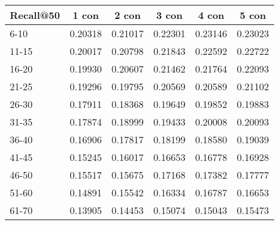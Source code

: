 \begin{table*}[]
    \begin{tabular}{|l|l|l|l|l|l|}
    \hline
    Recall@50 & \multicolumn{1}{c|}{1 con} & \multicolumn{1}{c|}{2 con} & \multicolumn{1}{c|}{3 con} & \multicolumn{1}{c|}{4 con} & \multicolumn{1}{c|}{5 con} \\ \hline
    6-10      & 0.20318                    & 0.21017                    & 0.22301                    & 0.23146                    & 0.23023                           \\ \hline
    11-15     & 0.20017                    & 0.20798                    & 0.21843                    & 0.22592                    & 0.22722                    \\ \hline
    16-20     & 0.19930                    & 0.20607                    & 0.21462                    & 0.21764                    & 0.22093                    \\ \hline
    21-25     & 0.19296                    & 0.19795                    & 0.20569                    & 0.20589                    & 0.21102                    \\ \hline
    26-30     & 0.17911                    & 0.18368                    & 0.19649                    & 0.19852                    & 0.19883                    \\ \hline
    31-35     & 0.17874                    & 0.18999                    & 0.19433                    & 0.20008                    & 0.20093                    \\ \hline
    36-40     & 0.16906                    & 0.17817                    & 0.18199                    & 0.18580                    & 0.19039             \\ \hline
    41-45     & 0.15245                    & 0.16017                    & 0.16653                    & 0.16778                    & 0.16928                    \\ \hline
    46-50     & 0.15517                    & 0.15675                    & 0.17168                    & 0.17382                    & 0.17777                    \\ \hline
    51-60     & 0.14891                    & 0.15542                    & 0.16334                    & 0.16787                    & 0.16653                    \\ \hline
    61-70     & 0.13905                    & 0.14453                    & 0.15074                    & 0.15043                    & 0.15473                    \\ \hline

\end{tabular}
\end{table*}
